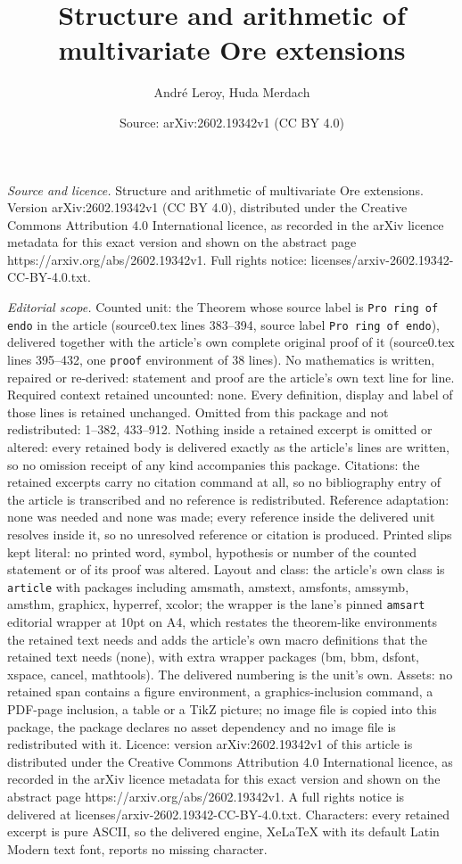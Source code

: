 \documentclass[10pt,a4paper]{amsart}
\title[Structure and arithmetic of multivariate Ore extensions]{Structure and arithmetic of multivariate Ore extensions}
\author{Andr\'e Leroy, Huda Merdach}
\date{Source: arXiv:2602.19342v1 (CC BY 4.0)}
\begin{document}
\maketitle

\noindent\emph{Source and licence.} Structure and arithmetic of multivariate Ore extensions. Version arXiv:2602.19342v1 (CC BY 4.0), distributed under the Creative Commons Attribution 4.0 International licence, as recorded in the arXiv licence metadata for this exact version and shown on the abstract page https://arxiv.org/abs/2602.19342v1. Full rights notice: licenses/arxiv-2602.19342-CC-BY-4.0.txt.\par\smallskip

\noindent\textit{Editorial scope.} Counted unit: the Theorem whose source label is \texttt{Pro ring of endo} in the article (source0.tex lines 383--394, source label \texttt{Pro ring of endo}), delivered together with the article's own complete original proof of it (source0.tex lines 395--432, one \texttt{proof} environment of 38 lines). No mathematics is written, repaired or re-derived: statement and proof are the article's own text line for line. Required context retained uncounted: none. Every definition, display and label of those lines is retained unchanged. Omitted from this package and not redistributed: 1--382, 433--912. Nothing inside a retained excerpt is omitted or altered: every retained body is delivered exactly as the article's lines are written, so no omission receipt of any kind accompanies this package. Citations: the retained excerpts carry no citation command at all, so no bibliography entry of the article is transcribed and no reference is redistributed. Reference adaptation: none was needed and none was made; every reference inside the delivered unit resolves inside it, so no unresolved reference or citation is produced. Printed slips kept literal: no printed word, symbol, hypothesis or number of the counted statement or of its proof was altered. Layout and class: the article's own class is \texttt{article} with packages including amsmath, amstext, amsfonts, amssymb, amsthm, graphicx, hyperref, xcolor; the wrapper is the lane's pinned \texttt{amsart} editorial wrapper at 10pt on A4, which restates the theorem-like environments the retained text needs and adds the article's own macro definitions that the retained text needs (none), with extra wrapper packages (bm, bbm, dsfont, xspace, cancel, mathtools). The delivered numbering is the unit's own. Assets: no retained span contains a figure environment, a graphics-inclusion command, a PDF-page inclusion, a table or a TikZ picture; no image file is copied into this package, the package declares no asset dependency and no image file is redistributed with it. Licence: version arXiv:2602.19342v1 of this article is distributed under the Creative Commons Attribution 4.0 International licence, as recorded in the arXiv licence metadata for this exact version and shown on the abstract page https://arxiv.org/abs/2602.19342v1. A full rights notice is delivered at licenses/arxiv-2602.19342-CC-BY-4.0.txt. Characters: every retained excerpt is pure ASCII, so the delivered engine, XeLaTeX with its default Latin Modern text font, reports no missing character.
\end{document}
